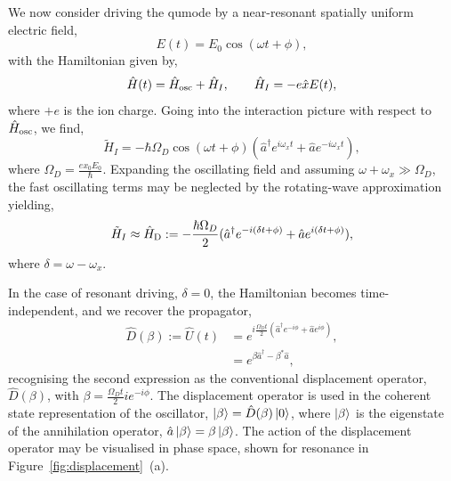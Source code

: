 We now consider driving the qumode by a near-resonant spatially uniform electric field,
\begin{equation}
    E(t) = E_0  \cos(\omega t + \phi),
\end{equation}
with the Hamiltonian given by,
\begin{equation}
    \hat H(t) = \hat H_{\rm osc} + \hat H_I, ~~~~~~ \hat H_I = -e\hat xE(t),
\end{equation}
where $+e$ is the ion charge. 
Going into the interaction picture with respect to $\hat H_{\rm osc}$, we find,
\begin{equation}
    \tilde H_I = -\hbar \Omega_D\cos(\omega t + \phi) (\hat a^\dagger e^{i\omega_x t}+\hat ae^{-i\omega_x t}),
\end{equation}
where $\Omega_D = \frac{ex_0E_0}{\hbar}$. Expanding the oscillating field and assuming $\omega+ \omega_x \gg \Omega_D$, the fast oscillating terms may be neglected by the rotating-wave approximation yielding,
\begin{equation}
    \label{eqn:displace_H}
    \tilde H_I \approx \hat H_{\rm D} := -\frac{\hbar \Omega_D}{2}(\hat a^\dagger e^{-i(\delta t+\phi)}+\hat ae^{i(\delta t+\phi)}),
\end{equation}
where $\delta = \omega - \omega_x$.

In the case of resonant driving, $\delta = 0$, the Hamiltonian becomes time-independent, and we recover the propagator,
\begin{subequations}
\begin{align}
    \hat D(\beta) := \hat U(t) &= e^{i\frac{\Omega_D t}{2}(\hat a^\dagger e^{-i\phi}+\hat a e^{i\phi})},\\
    &= e^{\beta \hat a^\dagger - \beta^*\hat a},
\end{align}
\end{subequations}
recognising the second expression as the conventional displacement operator,
$\hat D(\beta)$, with $\beta = \frac{\Omega_D t}{2}ie^{-i\phi}$. The
displacement operator is used in the coherent state representation of the
oscillator, $\ket{\beta} = \hat D(\beta)\ket{0}$, where $\ket{\beta}$ is the eigenstate of the annihilation operator, $\hat a\ket{\beta} = \beta\ket{\beta}$.  The action of the displacement
operator may be visualised in phase space, shown for resonance in
Figure~\ref{fig:displacement}~(a).

